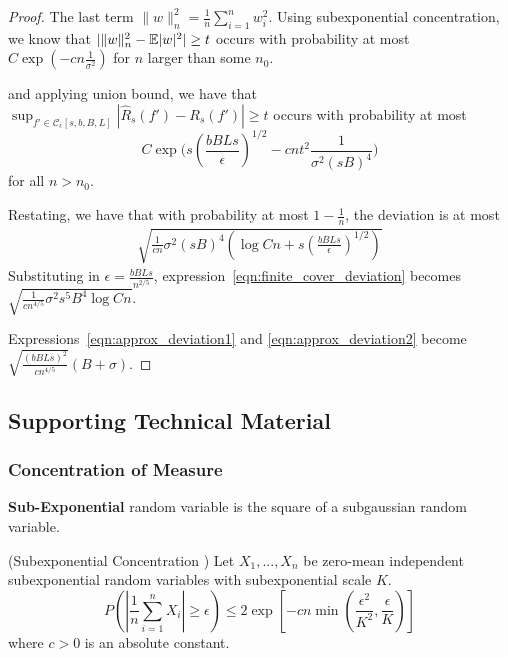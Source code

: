 \begin{proof}
The last term $\| w \|_n^2 = \frac{1}{n} \sum_{i=1}^n w_i^2$. Using subexponential concentration, we know that $ |\| w \|_n^2 - {\mathbb E}|w|^2 | \geq t$ occurs with probability at most $C \exp( - c n \frac{1}{\sigma^2} )$ for $n$ larger than some $n_0$.




and applying union bound, we have that $\sup_{f' \in \mathcal{C}_\epsilon[s,b,B,L]} | \hat{R}_s(f') - R_s(f') | \geq t$ occurs with probability at most
\[
C \exp\big( s\left( \frac{bBLs}{\epsilon} \right)^{1/2} - c n t^2 \frac{1}{\sigma^2 (sB)^4} \big)
\]
for all $n > n_0$.

Restating, we have that with probability at most $1- \frac{1}{n}$, the deviation is at most 
\begin{align}
\sqrt{ \frac{1}{cn} \sigma^2 (sB)^4 \left( \log Cn + s( \frac{bBLs}{\epsilon})^{1/2} \right)} \label{eqn:finite_cover_deviation}
\end{align}
Substituting in $\epsilon = \frac{bBLs}{n^{2/5}}$, expression~\ref{eqn:finite_cover_deviation} becomes $\sqrt{ \frac{1}{cn^{4/5}} \sigma^2 s^5 B^4 \log Cn}$.

Expressions~\ref{eqn:approx_deviation1} and \ref{eqn:approx_deviation2} become $\sqrt{ \frac{(bBLs)^2}{cn^{4/5}}} (B+\sigma)$.

\end{proof}
 
 
 
 
 
 
 
 \subsection{Supporting Technical Material}
 
 \subsubsection{Concentration of Measure}

\textbf{Sub-Exponential} random variable is the square of a subgaussian random variable\cite{vershynin2010introduction}.

\begin{proposition} (Subexponential Concentration \cite{vershynin2010introduction})
Let $X_1,...,X_n$ be zero-mean independent subexponential random variables with subexponential scale $K$. 
\[
P( | \frac{1}{n} \sum_{i=1}^n X_i | \geq \epsilon) \leq
	2 \exp \left[ -c n \min\left( \frac{\epsilon^2}{K^2}, \frac{\epsilon}{K} \right) \right]
\]
where $c > 0$ is an absolute constant.
\end{proposition}

